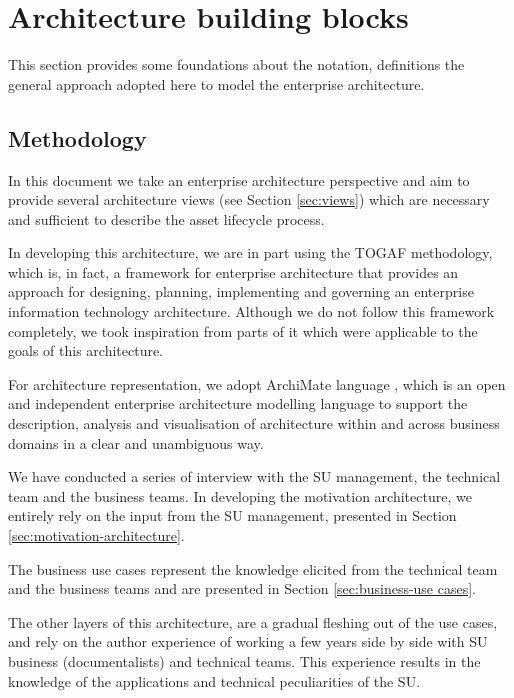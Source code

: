 \section{Architecture building blocks}
\label{sec:building-blocks}

	This section provides some foundations about the notation, definitions the general approach adopted here to model the enterprise architecture.

	\subsection{Methodology}
	
	In this document we take an enterprise architecture perspective and aim to provide several architecture views (see Section \ref{sec:views}) which are necessary and sufficient to describe the asset lifecycle process. 
	
	In developing this architecture, we are in part using the TOGAF \citep{togaf9.2} methodology, which is, in fact, a framework for enterprise architecture that provides an approach for designing, planning, implementing and governing an enterprise information technology architecture. Although we do not follow this framework completely, we took inspiration from parts of it which were applicable to the goals of this architecture.  
	
	For architecture representation, we adopt ArchiMate language \citep{archimate3.1}, which is an open and independent enterprise architecture modelling language to support the description, analysis and visualisation of architecture within and across business domains in a clear and unambiguous way.

	We have conducted a series of interview with the SU management, the technical team and the business teams. In developing the motivation architecture, we entirely rely on the input from the SU management, presented in Section \ref{sec:motivation-architecture}.
	
	 The business use cases represent the knowledge elicited from the technical team and the business teams and are presented in Section \ref{sec:business-use cases}. 
	 
	 The other layers of this architecture, are a gradual fleshing out of the use cases, and rely on the author experience of working a few years side by side with SU business (documentalists) and technical teams. This experience results in the knowledge of the applications and technical peculiarities of the SU. 
	 
